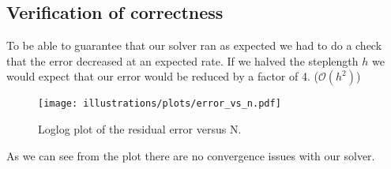 
\subsection{Verification of correctness} %
\label{sub:verification_of_correctness}
To be able to guarantee that our solver ran as expected we had to do a check that the error decreased at an expected rate. If we halved the steplength $h$ we would expect that our error would be reduced by a factor of 4. ($\mathcal{O}(h^2)$)

\begin{figure}[htbp]
	\centering
	\texttt{[image: illustrations/plots/error\_vs\_n.pdf]}
	\caption{Loglog plot of the residual error versus N.}
	\label{fig:label}
\end{figure}

As we can see from the plot there are no convergence issues with our solver.


